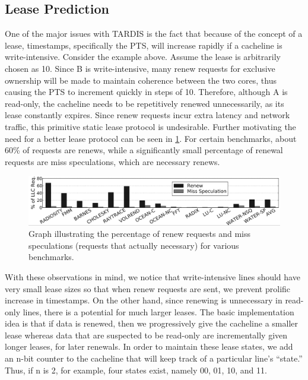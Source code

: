\documentclass[12pt]{article}
\begin{document}
\subsection{Lease Prediction}
One of the major issues with TARDIS is the fact that because of the concept of a lease, timestamps, specifically the PTS, will increase rapidly if a cacheline is write-intensive. Consider the example above. Assume the lease is arbitrarily chosen as 10. Since B is write-intensive, many renew requests for exclusive ownership will be made to maintain coherence between the two cores, thus causing the PTS to increment quickly in steps of 10. Therefore, although A is read-only, the cacheline needs to be repetitively renewed unnecessarily, as its lease constantly expires. Since renew requests incur extra latency and network traffic, this primitive static lease protocol is undesirable.
Further motivating the need for a better lease protocol can be seen in \ref{fig:renewals}. For certain benchmarks, about 60\% of requests are renews, while a significantly small percentage of renewal requests are miss speculations, which are necessary renews.

\begin{figure}
\begin{center}
  \includegraphics[width=16cm]{image1.png}
  \caption{Graph illustrating the percentage of renew requests and miss speculations (requests that actually necessary) for various benchmarks. }
  \label{fig:renewals}
\end{center}
\end{figure}

With these observations in mind, we notice that write-intensive lines should have very small lease sizes so that when renew requests are sent, we prevent prolific increase in timestamps. On the other hand, since renewing is unnecessary in read-only lines, there is a potential for much larger leases.
The basic implementation idea is that if data is renewed, then we progressively give the cacheline a smaller lease whereas data that are suspected to be read-only are incrementally given longer leases, for later renewals. In order to maintain these lease states, we add an n-bit counter to the cacheline that will keep track of a particular line’s “state.” Thus, if n is 2, for example, four states exist, namely 00, 01, 10, and 11. 
\end{document}
